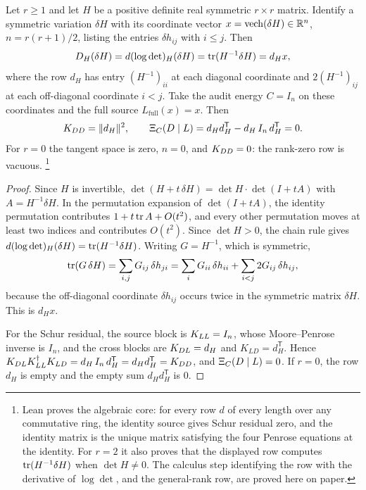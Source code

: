 \begin{theorem}\label{thm:apparatus:height-schur-collapse}
Let $r\ge1$ and let $H$ be a positive definite real symmetric $r\times r$
matrix.  Identify a symmetric variation $\delta H$ with its coordinate
vector $x=\operatorname{vech}(\delta H)\in\mathbb{R}^n$, $n=r(r+1)/2$, listing the
entries $\delta h_{ij}$ with $i\le j$.  Then
\[
  D_H(\delta H)
  =
  d(\log\det)_H(\delta H)
  =
  \operatorname{tr}(H^{-1}\delta H)
  =
  d_Hx,
\]
where the row $d_H$ has entry $(H^{-1})_{ii}$ at each diagonal
coordinate and $2(H^{-1})_{ij}$ at each off-diagonal coordinate $i<j$.
Take the audit energy $C=I_n$ on these coordinates and the full source
$L_{\mathrm{full}}(x)=x$.  Then
\[
  K_{DD}=\|d_H\|^2,
  \qquad
  \Xi_C(D\mid L)=d_Hd_H^{\mathsf T}-d_H\,I_n\,d_H^{\mathsf T}=0 .
\]
For $r=0$ the tangent space is zero, $n=0$, and $K_{DD}=0$: the rank-zero
row is vacuous.%
\footnote{Lean proves the algebraic core: for every row $d$ of every
length over any commutative ring, the identity source gives Schur
residual zero, and the identity matrix is the unique matrix satisfying
the four Penrose equations at the identity.  For $r=2$ it also proves
that the displayed row computes $\operatorname{tr}(H^{-1}\delta H)$ when
$\det H\neq0$.  The calculus step identifying the row with the derivative
of $\log\det$, and the general-rank row, are proved here on paper.}
\end{theorem}

\begin{proof}
Since $H$ is invertible, $\det(H+t\,\delta H)=\det H\cdot\det(I+tA)$ with
$A=H^{-1}\delta H$.  In the permutation expansion of $\det(I+tA)$, the
identity permutation contributes $1+t\operatorname{tr} A+O(t^2)$, and every other
permutation moves at least two indices and contributes $O(t^2)$.  Since
$\det H>0$, the chain rule gives $d(\log\det)_H(\delta H)=\operatorname{tr}(H^{-1}\delta
H)$.  Writing $G=H^{-1}$, which is symmetric,
\[
  \operatorname{tr}(G\,\delta H)=\sum_{i,j}G_{ij}\,\delta h_{ji}
  =\sum_i G_{ii}\,\delta h_{ii}+\sum_{i<j}2G_{ij}\,\delta h_{ij},
\]
because the off-diagonal coordinate $\delta h_{ij}$ occurs twice in the
symmetric matrix $\delta H$.  This is $d_Hx$.

For the Schur residual, the source block is $K_{LL}=I_n$, whose
Moore--Penrose inverse is $I_n$, and the cross blocks are $K_{DL}=d_H$ and
$K_{LD}=d_H^{\mathsf T}$.  Hence
$K_{DL}K_{LL}^{\dagger} K_{LD}=d_H\,I_n\,d_H^{\mathsf T}=d_Hd_H^{\mathsf T}=K_{DD}$,
and $\Xi_C(D\mid L)=0$.  If $r=0$, the row $d_H$ is empty and the empty sum
$d_Hd_H^{\mathsf T}$ is $0$.
\end{proof}

